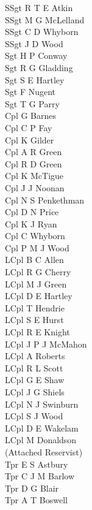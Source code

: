 \begin{multicols}{3}
  \small
  \noindent
  SSgt R T E Atkin \\
  SSgt M G McLelland \\
  SSgt C D Whyborn \\
  SSgt J D Wood \\
  Sgt H P Conway \\
  Sgt R G Gladding \\
  Sgt S E Hartley \\
  Sgt F Nugent \\
  Sgt T G Parry \\
  Cpl G Barnes \\
  Cpl C P Fay \\
  Cpl K Gilder \\
  Cpl A R Green \\
  Cpl R D Green \\
  Cpl K McTigue \\
  Cpl J J Noonan \\
  Cpl N S Penkethman \\
  Cpl D N Price \\
  Cpl K J Ryan \\
  Cpl C Whyborn \\
  Cpl P M J Wood \\
  LCpl B C Allen \\
  LCpl R G Cherry \\
  LCpl M J Green \\
  LCpl D E Hartley \\
  LCpl T Hendrie \\
  LCpl S E Hurst \\
  LCpl R E Knight \\
  LCpl J P J McMahon \\
  LCpl A Roberts \\
  LCpl R L Scott \\
  LCpl G E Shaw \\
  LCpl J G Shiels \\
  LCpl N J Swinburn \\
  LCpl S J Wood \\
  LCpl D E Wakelam \\
  LCpl M Donaldson \\ \indent (Attached Reservist) \\
  Tpr E S Astbury \\
  Tpr C J M Barlow \\
  Tpr D G Blair \\
  Tpr A T Boswell \\

\end{multicols}
